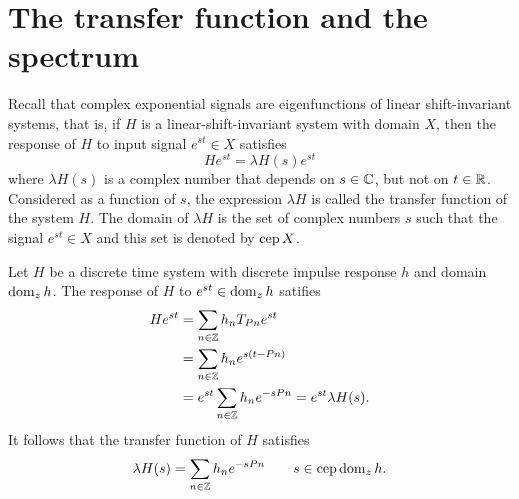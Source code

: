 \section{The transfer function and the spectrum}

Recall that complex exponential signals are eigenfunctions of linear shift-invariant systems, that is, if $H$ is a linear-shift-invariant system with domain $X$, then the response of $H$ to input signal $e^{st} \in X$ satisfies
 \[
He^{st} = \lambda H(s) e^{st}
\]
where $\lambda H(s)$ is a complex number that depends on $s \in {\mathbb C}$, but not on $t \in {\mathbb R}$.  Considered as a function of $s$, the expression $\lambda H$ is called the transfer function of the system $H$.  The domain of $\lambda H$ is the set of complex numbers $s$ such that the signal $e^{st} \in X$ and this set is denoted by $\operatorname{cep} X$.

Let $H$ be a discrete time system with discrete impulse response $h$ and domain $\operatorname{dom}_z h$.  The response of $H$ to $e^{st} \in \operatorname{dom}_z h$ satifies
\begin{align*}
H e^{st} &= \sum_{n \in {\mathbb Z}} h_n T_{Pn} e^{st} \\
&= \sum_{n \in {\mathbb Z}} h_n e^{s(t-Pn)} \\
&= e^{st} \sum_{n \in {\mathbb Z}} h_n e^{-sPn} = e^{st} \lambda H(s).
\end{align*}
It follows that the transfer function of $H$ satisfies
\[
\lambda H(s) = \sum_{n \in {\mathbb Z}} h_n e^{-sPn} \qquad s \in \operatorname{cep} \operatorname{dom}_z h.
\]

